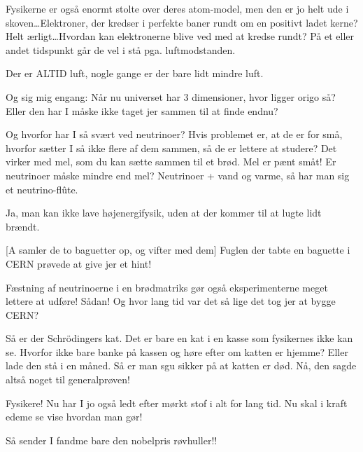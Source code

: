 \documentclass[a4paper,11pt]{article}
\begin{document}
\begin{sketch}
 Fysikerne er også enormt stolte over deres atom-model, men
den er jo helt ude i skoven\ldots Elektroner, der kredser i perfekte
baner rundt om en positivt ladet kerne? Helt ærligt\ldots Hvordan kan
elektronerne blive ved med at kredse rundt? På et eller andet
tidspunkt går de vel i stå pga. luftmodstanden.


 Der er ALTID luft, nogle gange er der bare lidt mindre luft.

 Og sig mig engang: Når nu universet har 3 dimensioner, hvor
ligger origo så? Eller den har I måske ikke taget jer sammen til at
finde endnu?

 Og hvorfor har I så svært ved neutrinoer?  Hvis problemet er,
at de er for små, hvorfor sætter I så ikke flere af dem sammen, så de
er lettere at studere? Det virker med mel, som du kan sætte sammen til
et brød. Mel er pænt småt! Er neutrinoer måske mindre end mel?
Neutrinoer + vand og varme, så har man sig et neutrino-flûte.


 Ja, man kan ikke lave højenergifysik, uden at der kommer
til at lugte lidt brændt.

[A samler de to baguetter op, og vifter med dem] Fuglen der
tabte en baguette i CERN prøvede at give jer et hint!

 Fæstning af neutrinoerne i en brødmatriks gør også
eksperimenterne meget lettere at udføre!  Sådan!
Og hvor lang tid var det så lige det tog jer at bygge CERN?

 Så er der Schrödingers kat. Det er bare en kat i en kasse som
fysikernes ikke kan se. Hvorfor ikke bare banke på kassen og høre
efter om katten er hjemme? Eller lade den stå i en måned. Så er man sgu sikker på at
katten er død.  Nå, den sagde
altså noget til generalprøven!


 Fysikere! Nu har I jo også ledt efter mørkt stof i alt for lang tid. Nu skal i kraft edeme se vise hvordan man gør! 


 Så sender I fandme bare den nobelpris røvhuller!!

\end{sketch}
\end{document}
